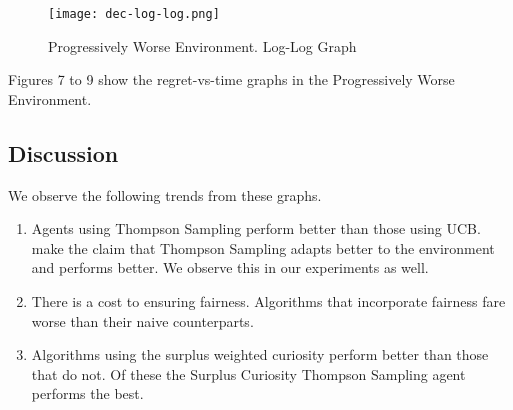 \begin{figure}[h!]
    \centering
    \texttt{[image: dec-log-log.png]}
    \caption{Progressively Worse Environment. Log-Log Graph}
    \label{fig:d3}
\end{figure}

Figures 7 to 9 show the regret-vs-time graphs in the Progressively Worse Environment.

\subsection{Discussion}
We observe the following trends from these graphs.

\begin{enumerate}
    \item Agents using Thompson Sampling perform better than those using UCB.  make the claim that Thompson Sampling adapts better to the environment and performs better. We observe this in our experiments as well.
    \item There is a cost to ensuring fairness. Algorithms that incorporate fairness fare worse than their naive counterparts. 
    \item Algorithms using the surplus weighted curiosity perform better than those that do not. Of these the Surplus Curiosity Thompson Sampling agent performs the best.
\end{enumerate}


